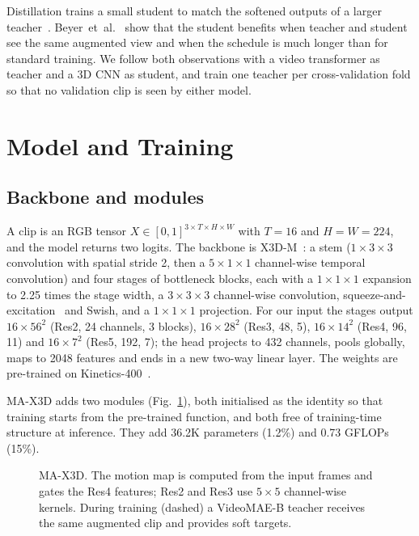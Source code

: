 \documentclass[conference]{IEEEtran}
\begin{document}
Distillation trains a small student to match the softened outputs of a
larger teacher~\cite{hinton2015}. Beyer~et~al.~\cite{beyer2022} show that
the student benefits when teacher and student see the same augmented view
and when the schedule is much longer than for standard training. We follow
both observations with a video transformer as teacher and a 3D CNN as
student, and train one teacher per cross-validation fold so that no
validation clip is seen by either model.

\section{Model and Training}
\label{sec:method}

\subsection{Backbone and modules}

A clip is an RGB tensor $X \in [0,1]^{3 \times T \times H \times W}$ with
$T=16$ and $H=W=224$, and the model returns two logits. The backbone is
X3D-M~\cite{x3d}: a stem ($1\times3\times3$ convolution with spatial stride
2, then a $5\times1\times1$ channel-wise temporal convolution) and four
stages of bottleneck blocks, each with a $1\times1\times1$ expansion to
2.25 times the stage width, a $3\times3\times3$ channel-wise convolution,
squeeze-and-excitation~\cite{se} and Swish, and a $1\times1\times1$
projection. For our input the stages output $16\times56^2$ (Res2, 24
channels, 3 blocks), $16\times28^2$ (Res3, 48, 5), $16\times14^2$ (Res4,
96, 11) and $16\times7^2$ (Res5, 192, 7); the head projects to 432
channels, pools globally, maps to 2048 features and ends in a new two-way
linear layer. The weights are pre-trained on Kinetics-400~\cite{kinetics}.

MA-X3D adds two modules (Fig.~\ref{fig:pipeline}), both initialised as the
identity so that training starts from the pre-trained function, and both
free of training-time structure at inference. They add 36.2K parameters
(1.2\%) and 0.73 GFLOPs (15\%).

\begin{figure}[t]
  \centering
  \caption{MA-X3D. The motion map is computed from the input frames and
  gates the Res4 features; Res2 and Res3 use $5\times5$ channel-wise
  kernels. During training (dashed) a VideoMAE-B teacher receives the same
  augmented clip and provides soft targets.}
  \label{fig:pipeline}
\end{figure}
\end{document}
